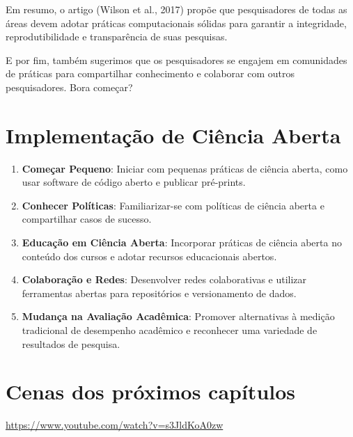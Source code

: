 \documentclass[
  a4paper,
]{book}
\providecommand{\tightlist}{%
  \setlength{\itemsep}{0pt}\setlength{\parskip}{0pt}}\usepackage{longtable,booktabs,array}
\begin{document}
Em resumo, o artigo (Wilson et al., 2017) propõe que pesquisadores de
todas as áreas devem adotar práticas computacionais sólidas para
garantir a integridade, reprodutibilidade e transparência de suas
pesquisas.

E por fim, também sugerimos que os pesquisadores se engajem em
comunidades de práticas para compartilhar conhecimento e colaborar com
outros pesquisadores. Bora começar?

\section{Implementação de Ciência
Aberta}\label{implementauxe7uxe3o-de-ciuxeancia-aberta}

\begin{enumerate}
\def\labelenumi{\arabic{enumi}.}
\tightlist
\item
  \textbf{Começar Pequeno}: Iniciar com pequenas práticas de ciência
  aberta, como usar software de código aberto e publicar pré-prints.
\item
  \textbf{Conhecer Políticas}: Familiarizar-se com políticas de ciência
  aberta e compartilhar casos de sucesso.
\item
  \textbf{Educação em Ciência Aberta}: Incorporar práticas de ciência
  aberta no conteúdo dos cursos e adotar recursos educacionais abertos.
\item
  \textbf{Colaboração e Redes}: Desenvolver redes colaborativas e
  utilizar ferramentas abertas para repositórios e versionamento de
  dados.
\item
  \textbf{Mudança na Avaliação Acadêmica}: Promover alternativas à
  medição tradicional de desempenho acadêmico e reconhecer uma variedade
  de resultados de pesquisa.
\end{enumerate}

\section{Cenas dos próximos
capítulos}\label{cenas-dos-pruxf3ximos-capuxedtulos}

\url{https://www.youtube.com/watch?v=s3JldKoA0zw}
\end{document}
